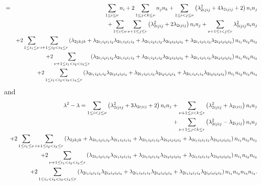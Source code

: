 \documentclass[12pt]{article}
\begin{document}
\begin{eqnarray}
&=&\sum_{1\leq i\leq \nu }n_{i}+2\sum_{1\leq j<k\leq \nu
}n_{j}n_{k}+\sum_{1\leq i<j\leq \nu }\left( \lambda _{2ijij}^{2}+4\lambda
_{2ijij}+2\right) n_{i}n_{j}  \notag \\
&&+\sum_{1\leq i\leq \nu }\sum_{\nu +1\leq j\leq r}\left( \lambda
_{2ijij}^{2}+2\lambda _{2ijij}\right) n_{i}n_{j}+\sum_{\nu +1\leq i<j\leq
r}\lambda _{2ijij}^{2}n_{i}n_{j}  \notag \\
&&+2\sum_{1\leq i_{1}\leq \nu }\sum_{i+1\leq i_{2}<i_{3}\leq r}\left(
\lambda _{2jkjk}+\lambda _{2i_{1}i_{2}i_{1}i_{2}}\lambda
_{2i_{1}i_{3}i_{1}i_{3}}+\lambda _{2i_{1}i_{2}i_{1}i_{2}}\lambda
_{2i_{2}i_{3}i_{2}i_{3}}+\lambda _{2i_{1}i_{3}i_{1}i_{3}}\lambda
_{2i_{2}i_{3}i_{2}i_{3}}\right) n_{i_{1}}n_{i_{2}}n_{i_{3}}  \notag \\
&&+2\sum_{\nu +1\leq i_{1}<i_{2}<i_{3}\leq r}\left( \lambda
_{2i_{1}i_{2}i_{1}i_{2}}\lambda _{2i_{1}i_{3}i_{1}i_{3}}+\lambda
_{2i_{1}i_{2}i_{1}i_{2}}\lambda _{2i_{2}i_{3}i_{2}i_{3}}+\lambda
_{2i_{1}i_{3}i_{1}i_{3}}\lambda _{2i_{2}i_{3}i_{2}i_{3}}\right)
n_{i_{1}}n_{i_{2}}n_{i_{3}}  \notag \\
&&+2\sum_{1\leq i_{1}<i_{2}<i_{3}<i_{4}\leq r}\left( \lambda
_{2i_{1}i_{2}i_{1}i_{2}}\lambda _{2i_{3}i_{4}i_{3}i_{4}}+\lambda
_{2i_{1}i_{3}i_{1}i_{3}}\lambda _{2i_{2}i_{4}i_{2}i_{4}}+\lambda
_{2i_{1}i_{4}i_{1}i_{4}}\lambda _{2i_{2}i_{3}i_{2}i_{3}}\right)
n_{i_{1}}n_{i_{2}}n_{i_{3}}n_{i_{4}}
\end{eqnarray}%
and 
\begin{eqnarray}
&&\lambda ^{2}-\lambda =\sum_{1\leq i<j\leq \nu }\left( \lambda
_{2ijij}^{2}+3\lambda _{2ijij}+2\right) n_{i}n_{j}+\sum_{\nu +1\leq j<k\leq
r}\left( \lambda _{2ijij}^{2}+\lambda _{2ijij}\right) n_{i}n_{j}  \notag \\
&&+\sum_{\nu +1\leq j<k\leq r}\left( \lambda _{2ijij}^{2}-\lambda
_{2ijij}\right) n_{i}n_{j}  \notag \\
&&+2\sum_{1\leq i_{1}\leq \nu }\sum_{i+1\leq i_{2}<i_{3}\leq r}\left(
\lambda _{2jkjk}+\lambda _{2i_{1}i_{2}i_{1}i_{2}}\lambda
_{2i_{1}i_{3}i_{1}i_{3}}+\lambda _{2i_{1}i_{2}i_{1}i_{2}}\lambda
_{2i_{2}i_{3}i_{2}i_{3}}+\lambda _{2i_{1}i_{3}i_{1}i_{3}}\lambda
_{2i_{2}i_{3}i_{2}i_{3}}\right) n_{i_{1}}n_{i_{2}}n_{i_{3}}  \notag \\
&&+2\sum_{\nu +1\leq i_{1}<i_{2}<i_{3}\leq r}\left( \lambda
_{2i_{1}i_{2}i_{1}i_{2}}\lambda _{2i_{1}i_{3}i_{1}i_{3}}+\lambda
_{2i_{1}i_{2}i_{1}i_{2}}\lambda _{2i_{2}i_{3}i_{2}i_{3}}+\lambda
_{2i_{1}i_{3}i_{1}i_{3}}\lambda _{2i_{2}i_{3}i_{2}i_{3}}\right)
n_{i_{1}}n_{i_{2}}n_{i_{3}}  \notag \\
&&+2\sum_{1\leq i_{1}<i_{2}<i_{3}<i_{4}\leq r}\left( \lambda
_{2i_{1}i_{2}i_{1}i_{2}}\lambda _{2i_{3}i_{4}i_{3}i_{4}}+\lambda
_{2i_{1}i_{3}i_{1}i_{3}}\lambda _{2i_{2}i_{4}i_{2}i_{4}}+\lambda
_{2i_{1}i_{4}i_{1}i_{4}}\lambda _{2i_{2}i_{3}i_{2}i_{3}}\right)
n_{i_{1}}n_{i_{2}}n_{i_{3}}n_{i_{4}}.
\end{eqnarray}%
\end{document}
